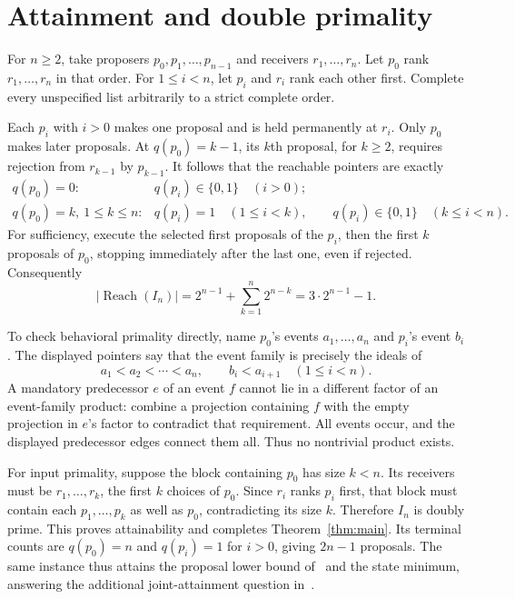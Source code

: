 \documentclass[11pt]{article}
\newcommand{\Reach}{\operatorname{Reach}}
\begin{document}
\section{Attainment and double primality}\label{sec:sharp}

For $n\ge2$, take proposers $p_0,p_1,\ldots,p_{n-1}$ and receivers
$r_1,\ldots,r_n$. Let $p_0$ rank $r_1,\ldots,r_n$ in that order.
For $1\le i<n$, let $p_i$ and $r_i$ rank each other first. Complete
every unspecified list arbitrarily to a strict complete order.

Each $p_i$ with $i>0$ makes one proposal and is held permanently at
$r_i$. Only $p_0$ makes later proposals. At $q(p_0)=k-1$, its $k$th
proposal, for $k\ge2$, requires rejection from $r_{k-1}$ by $p_{k-1}$.
It follows that the reachable pointers are exactly
\[
 \begin{array}{ll}
 q(p_0)=0:&q(p_i)\in\{0,1\}\quad(i>0);\\
 q(p_0)=k,\ 1\le k\le n:&q(p_i)=1\quad(1\le i<k),\qquad
 q(p_i)\in\{0,1\}\quad(k\le i<n).
 \end{array}
\]
For sufficiency, execute the selected first proposals of the $p_i$,
then the first $k$ proposals of $p_0$, stopping immediately after the
last one, even if rejected. Consequently
\[
 |\Reach(I_n)|=2^{n-1}+\sum_{k=1}^{n}2^{n-k}
             =3\cdot2^{n-1}-1.
\]

To check behavioral primality directly, name $p_0$'s events
$a_1,\ldots,a_n$ and $p_i$'s event $b_i$. The displayed pointers say
that the event family is precisely the ideals of
\[
          a_1<a_2<\cdots<a_n,\qquad
          b_i<a_{i+1}\quad(1\le i<n).
\]
A mandatory predecessor $e$ of an event $f$ cannot lie in a different
factor of an event-family product: combine a projection containing $f$
with the empty projection in $e$'s factor to contradict that
requirement. All events occur, and the displayed predecessor edges
connect them all. Thus no nontrivial product exists.

For input primality, suppose the block containing $p_0$ has size $k<n$.
Its receivers must be $r_1,\ldots,r_k$, the first $k$ choices of $p_0$.
Since $r_i$ ranks $p_i$ first, that block must contain each
$p_1,\ldots,p_k$ as well as $p_0$, contradicting its size $k$.
Therefore $I_n$ is doubly prime. This proves attainability and completes
Theorem~\ref{thm:main}. Its terminal counts are $q(p_0)=n$ and
$q(p_i)=1$ for $i>0$, giving $2n-1$ proposals. The same instance thus
attains the proposal lower bound of~\cite[Proposition~21.4]{ishida}
and the state minimum, answering the additional joint-attainment
question in~\cite[Section~7(A)]{ishida}.
\end{document}
